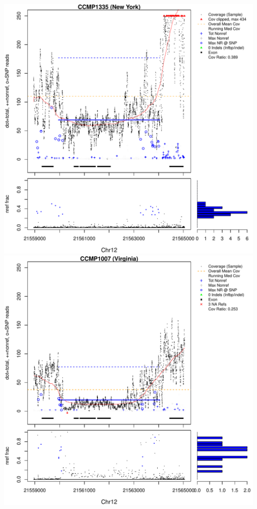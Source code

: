 \documentclass{article}\usepackage[]{graphicx}\usepackage[]{color}
\makeatletter
\def\maxwidth{ %
  \ifdim\Gin@nat@width>\linewidth
    \linewidth
  \else
    \Gin@nat@width
  \fi
}
\newenvironment{knitrout}{}{} %
\makeatother
\begin{document}
\begin{knitrout}
{\centering \includegraphics[width=\maxwidth]{figs-knitr/unnamed-chunk-53-1} 
\includegraphics[width=\maxwidth]{figs-knitr/unnamed-chunk-53-2} 
}
\end{knitrout}
\end{document}
